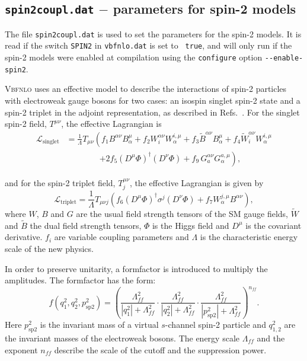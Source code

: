 \documentclass[english,12pt]{article}
\begin{document}

\subsection{{\tt spin2coupl.dat} $-$ parameters for spin-2 models}

The file {\tt spin2coupl.dat} is used to set the parameters for the spin-2
models.  It is read if the switch {\tt SPIN2} in {\tt vbfnlo.dat} is set to {\tt
true}, and will only run if the spin-2 models were enabled at compilation
using the {\tt configure} option {\tt -{}-enable-spin2}.

\textsc{Vbfnlo} uses an effective model to describe the interactions of spin-2
particles with electroweak gauge bosons for two cases: an isospin singlet spin-2 state
and a spin-2 triplet in the adjoint representation, as described in
Refs.~\cite{frank,Frank:2012wh,Frank:2013gca}. For the singlet spin-2 field, $T^{\mu\nu}$, the effective
Lagrangian is
\begin{align}
 \mathcal{L}_{\text{singlet}} & = \frac{1}{\Lambda} T_{\mu \nu} \left( f_{1} B^{\alpha \nu} B^{\mu}_{\alpha} + f_{2} W_{i}^{\alpha \nu} W^{i,\mu}_{\alpha} + f_3 \widetilde{B}^{\alpha \nu} B^\mu_{\alpha} 
+f_4\widetilde{W}_i^{\alpha \nu} W^{i, \mu}_{\alpha} \right. \nonumber \\
 & \quad \quad \quad \quad \left. +  2 f_{5} (D^{\mu} \Phi)^{\dagger} (D^{\nu}\Phi) + f_9 \, G^{\alpha \nu}_{a} G^{a, \mu}_{\alpha} \right),
\end{align}

and for the spin-2 triplet field, $T_{j}^{\mu\nu}$, the effective Lagrangian is given by
\begin{equation}
 \mathcal{L}_{\text{triplet}} = \frac{1}{\Lambda} T_{\mu\nu j} \left( f_{6} (D^{\mu}\Phi)^{\dagger} \sigma^{j} (D^{\nu} \Phi) + f_{7} W^{j,\mu}_{\alpha} B^{\alpha\nu} \right),
\end{equation}
where $W$, $B$ and $G$ are the usual field strength tensors of the SM gauge fields,
$\widetilde{W}$ and $\widetilde{B}$ the dual field strength tensors, $\Phi$ is
the Higgs field and $D^{\mu}$ is the covariant derivative.  $f_{i}$ are variable
coupling parameters and $\Lambda$ is the characteristic energy scale of the new
physics.

In order to preserve unitarity, a formfactor is introduced to multiply the
amplitudes.  The formfactor has the form:
\begin{equation}
 f(q_{1}^{2}, q_{2}^{2}, p^{2}_{\text{sp2}}) = \left( \frac{\Lambda_{ff}^{2}} {\left|q_{1}^{2}\right| + \Lambda_{ff}^{2}} \cdot \frac{\Lambda_{ff}^{2}} {\left|q_{2}^{2}\right| + \Lambda_{ff}^{2}} \cdot \frac{\Lambda_{ff}^{2}} {\left|p_{\text{sp2}}^{2}\right| + \Lambda_{ff}^{2}} \right) ^{n_{ff}}.
\end{equation}
Here $p^{2}_{\text{sp2}}$ is the invariant mass of a virtual $s$-channel spin-2 particle
and $q_{1,2}^{2}$ are the invariant masses of the electroweak bosons.  The
energy scale $\Lambda_{ff}$ and the exponent $n_{ff}$ describe the scale of the
cutoff and the suppression power.
\end{document}
